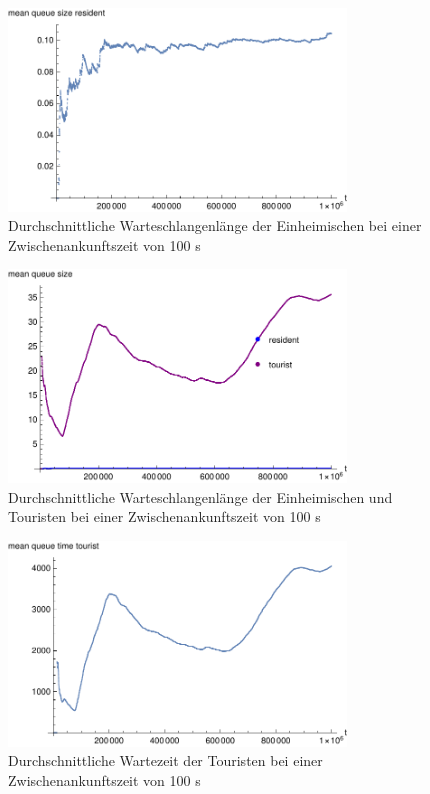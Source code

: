 \begin{figure}[htpb]
	\centering
	\includegraphics[width=0.8\textwidth]{abbildungen/1_Phone_VIP/Arrival_100_Serve_100_dur_1000000_Skip_0/MeanQueueSizeResident.pdf}
	\caption{Durchschnittliche Warteschlangenlänge der Einheimischen bei einer Zwischenankunftszeit von 100 s}
	\label{fig:1_Phone_VIP_100_MeanQueueSize_Resident}
\end{figure} 

\begin{figure}[htpb]
	\centering
	\includegraphics[width=0.8\textwidth]{abbildungen/1_Phone_VIP/Arrival_100_Serve_100_dur_1000000_Skip_0/MeanQueueSizeTouristAndResident.pdf}
	\caption{Durchschnittliche Warteschlangenlänge der Einheimischen und Touristen bei einer Zwischenankunftszeit von 100 s}
	\label{fig:1_Phone_VIP_100_MeanQueueSize_All}
\end{figure} 



\begin{figure}[htpb]
	\centering
	\includegraphics[width=0.8\textwidth]{abbildungen/1_Phone_VIP/Arrival_100_Serve_100_dur_1000000_Skip_0/MeanQueueTimeTourist.pdf}
	\caption{Durchschnittliche Wartezeit der Touristen bei einer Zwischenankunftszeit von 100 s}
	\label{fig:1_Phone_VIP_100_MeanQueueTime_Tourist}
\end{figure} 

